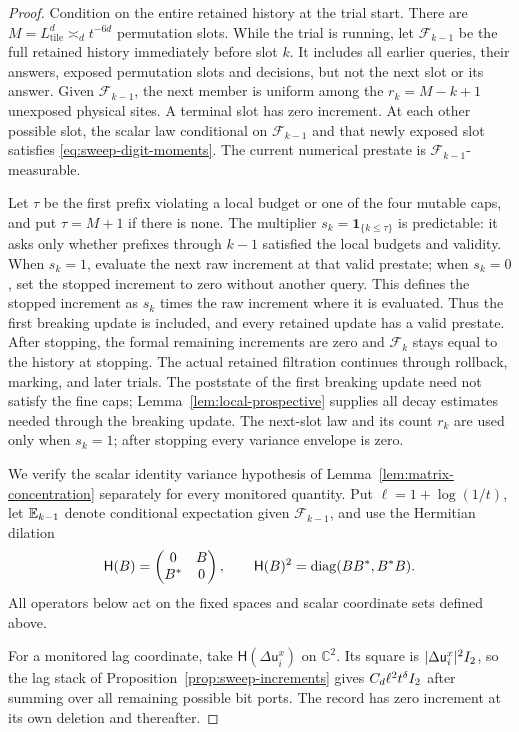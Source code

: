\begin{proof}
Condition on the entire retained history at the trial start.  There are
\(M=L_{\mathrm{tile}}^d\asymp_d t^{-6d}\) permutation slots. While the
trial is running, let \(\mathcal F_{k-1}\) be the full retained history
immediately before slot \(k\). It includes all earlier queries, their answers,
exposed permutation slots and decisions, but not the next slot or its
answer. Given \(\mathcal F_{k-1}\), the next member is uniform among
the \(r_k=M-k+1\) unexposed physical sites.  A terminal slot has zero
increment.  At each other possible slot, the scalar law conditional on
\(\mathcal F_{k-1}\) and that newly exposed slot satisfies
\eqref{eq:sweep-digit-moments}.  The current numerical
prestate is \(\mathcal F_{k-1}\)-measurable.

Let \(\tau\) be the first prefix violating a local budget or one of the
four mutable caps, and put \(\tau=M+1\) if there is none.  The multiplier
\(s_k=\mathbf1_{\{k\le\tau\}}\) is predictable: it asks only whether
prefixes through \(k-1\) satisfied the local budgets and validity.
When \(s_k=1\), evaluate the next raw increment at that valid prestate;
when \(s_k=0\), set the stopped increment to zero without another query.
This defines the stopped increment as \(s_k\) times the raw increment
where it is evaluated.  Thus the first breaking update is included,
and every retained update has a valid prestate. After stopping, the formal
remaining increments are zero and \(\mathcal F_k\) stays equal to the history
at stopping. The actual retained filtration continues through rollback,
marking, and later trials. The poststate of the
first breaking update need not satisfy the fine caps;
Lemma~\ref{lem:local-prospective} supplies all decay estimates needed
through the breaking update.  The next-slot law and its count \(r_k\)
are used only when \(s_k=1\); after stopping every variance envelope is zero.

We verify the scalar identity variance hypothesis of
Lemma~\ref{lem:matrix-concentration} separately for every monitored
quantity.  Put \(\ell=1+\log(1/t)\), let \(\mathbb E_{k-1}\) denote
conditional expectation given \(\mathcal F_{k-1}\), and use the
Hermitian dilation
\[
 \mathsf H(B)=\begin{pmatrix}0&B\\B^*&0\end{pmatrix},\qquad
 \mathsf H(B)^2=\operatorname{diag}(BB^*,B^*B).
\]
All operators below act on the fixed spaces and scalar coordinate sets
defined above.

For a monitored lag coordinate, take
\(\mathsf H(\Delta\mathsf u_i^x)\) on \(\mathbb C^2\).
Its square is \(|\Delta\mathsf u_i^x|^2I_2\), so the lag
stack of Proposition~\ref{prop:sweep-increments} gives
\(C_d\ell^2t^\delta I_2\) after summing over all remaining
possible bit ports.  The record has zero increment at its own
deletion and thereafter.


\end{proof}
